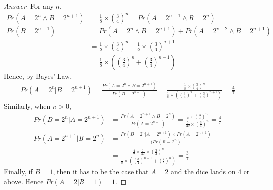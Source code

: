 \documentclass[11pt]{article}
\theoremstyle{definition}
\begin{document}
\begin{proof}[Answer]
For any $n$,
\begin{align*}
Pr(A = 2^n \land B = 2^{n+1}) & = \frac{1}{8} \times (\frac{3}{4})^n = Pr(A = 2^{n+1} \land B = 2^n) \\
Pr(B = 2^{n+1}) & = Pr(A = 2^{n} \land B = 2^{n+1}) +  Pr(A = 2^{n+2} \land B = 2^{n+1}) \\
& = \frac{1}{8} \times (\frac{3}{4})^n + \frac{1}{8} \times (\frac{3}{4})^{n+1} \\
& = \frac{1}{8} \times ((\frac{3}{4})^n + (\frac{3}{4})^{n+1})
\end{align*}
Hence, by Bayes' Law, 
\begin{align*}
Pr(A = 2^n | B = 2^{n+1}) = \frac{Pr(A = 2^n \land B = 2^{n+1})}{Pr(B = 2^{n+1})} = \frac{\frac{1}{8} \times (\frac{3}{4})^n}{\frac{1}{8} \times ((\frac{3}{4})^n + (\frac{3}{4})^{n+1})} = \frac{4}{7} 
\end{align*}
Similarly, when $n > 0$,
\begin{align*}
Pr(B = 2^n | A = 2^{n+1}) & = \frac{Pr(A = 2^{n+1} \land B = 2^{n})}{Pr(A = 2^{n+1})} = \frac{\frac{1}{8} \times (\frac{3}{4})^n}{\frac{7}{32} \times (\frac{3}{4})^n} = \frac{4}{7} \\
Pr(A = 2^{n+1} | B = 2^n) & = \frac{Pr(B = 2^n | A = 2^{n+1}) \times Pr(A = 2^{n+1})}{(Pr(B = 2^n)} \\
& = \frac{\frac{4}{7} \times\frac{7}{32} \times (\frac{3}{4})^n }{\frac{1}{8} \times ((\frac{3}{4})^{n-1} + (\frac{3}{4})^{n})} = \frac{3}{7}
\end{align*}
Finally, if $B = 1$, then it has to be the case that $A = 2$ and the dice lands on $4$ or above. Hence $Pr(A = 2 | B = 1) = 1$.

\end{proof}
\end{document}
